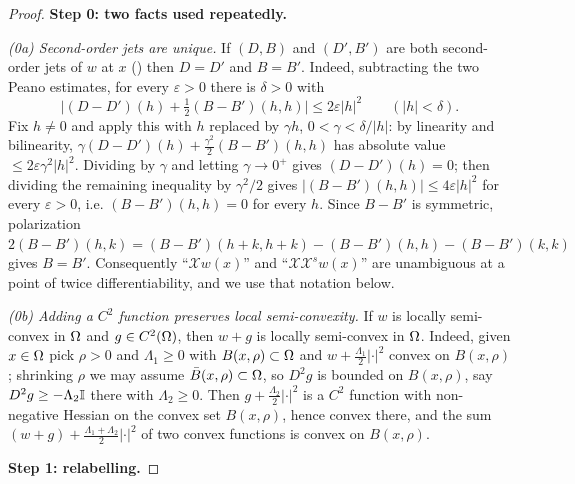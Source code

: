 \begin{proof}
\medskip\noindent\textbf{Step 0: two facts used repeatedly.}

\emph{(0a) Second-order jets are unique.} If $(D,B)$ and $(D',B')$ are both second-order
jets of $w$ at $x$ () then $D=D'$ and $B=B'$. Indeed, subtracting the
two Peano estimates, for every $\varepsilon>0$ there is $\delta>0$ with
\[
 \Big|(D-D')(h)+\tfrac12(B-B')(h,h)\Big|\le2\varepsilon|h|^{2}\qquad (|h|<\delta).
\]
Fix $h\ne0$ and apply this with $h$ replaced by $\gamma h$, $0<\gamma<\delta/|h|$: by
linearity and bilinearity,
$\gamma(D-D')(h)+\frac{\gamma^{2}}2(B-B')(h,h)$ has absolute value
$\le2\varepsilon\gamma^{2}|h|^{2}$. Dividing by $\gamma$ and letting $\gamma\to0^{+}$ gives
$(D-D')(h)=0$; then dividing the remaining inequality by $\gamma^{2}/2$ gives
$|(B-B')(h,h)|\le4\varepsilon|h|^{2}$ for every $\varepsilon>0$, i.e. $(B-B')(h,h)=0$ for
every $h$. Since $B-B'$ is symmetric, polarization
$2(B-B')(h,k)=(B-B')(h+k,h+k)-(B-B')(h,h)-(B-B')(k,k)$ gives $B=B'$. Consequently
``$\mathcal Xw(x)$'' and ``$\mathcal X\mathcal X^{s}w(x)$'' are unambiguous at a point of
twice differentiability, and we use that notation below.

\emph{(0b) Adding a $C^{2}$ function preserves local semi-convexity.} If $w$ is locally
semi-convex in $\Omega$ and $g\in C^{2}(\Omega)$, then $w+g$ is locally semi-convex in $\Omega$.
Indeed, given $x\in\Omega$ pick $\rho>0$ and $\Lambda_1\ge0$ with $B(x,\rho)\subset\Omega$ and
$w+\frac{\Lambda_1}2|\cdot|^{2}$ convex on $B(x,\rho)$; shrinking $\rho$ we may assume
$\bar B(x,\rho)\subset\Omega$, so $D^{2}g$ is bounded on $B(x,\rho)$, say
$D^{2}g\ge-\Lambda_2\mathbb{I}$ there with $\Lambda_2\ge0$. Then
$g+\frac{\Lambda_2}2|\cdot|^{2}$ is a $C^{2}$ function with non-negative Hessian on the
convex set $B(x,\rho)$, hence convex there, and the sum
$(w+g)+\frac{\Lambda_1+\Lambda_2}2|\cdot|^{2}$ of two convex functions is convex on
$B(x,\rho)$.

\medskip\noindent\textbf{Step 1: relabelling.}


\end{proof}
